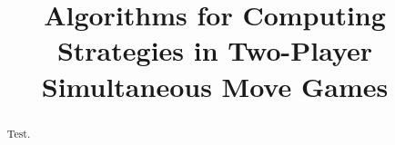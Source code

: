 \documentclass[preprint,12pt]{elsarticle}
\begin{document}
\begin{frontmatter}



\title{Algorithms for Computing Strategies in Two-Player Simultaneous Move Games}


\author{}

\address{}

\begin{abstract}
Test.
\end{abstract}

\begin{keyword}


\end{keyword}

\end{frontmatter}



\end{document}
